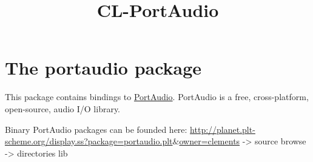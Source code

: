 \documentclass[a4paper]{report}
\begin{document}
    

    \title{CL-PortAudio}
    \maketitle

    \tableofcontents
    \newpage

    
    \chapter{The portaudio package}
    This package contains bindings to \href{http://portaudio.com/}{PortAudio}. PortAudio is a free, cross-platform, open-source, audio I/O library.


Binary PortAudio packages can be founded here: \href{}{http://planet.plt-scheme.org/display.ss?package=portaudio.plt$\&$owner=clements} -> source browse -> directories lib
\end{document}
